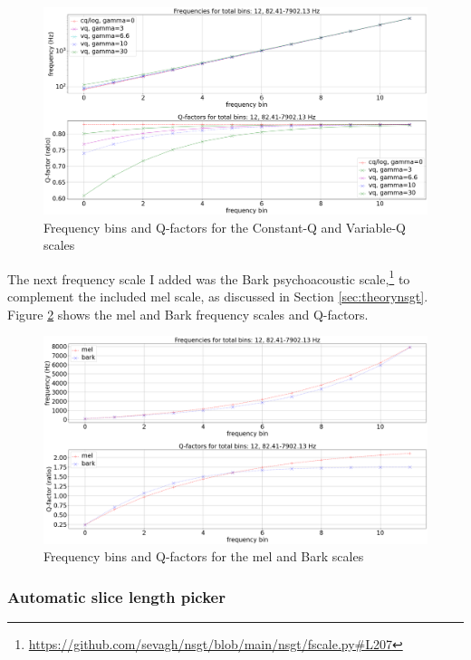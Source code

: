 \documentclass[report.tex]{subfiles}
\begin{document}
\begin{figure}[ht]
	\centering
	\includegraphics[width=\textwidth]{./images-freqscales/vqlog.png}
	\caption{Frequency bins and Q-factors for the Constant-Q and Variable-Q scales}
	\label{fig:vq}
\end{figure}

The next frequency scale I added was the Bark psychoacoustic scale,\footnote{\url{https://github.com/sevagh/nsgt/blob/main/nsgt/fscale.py\#L207}} to complement the included mel scale, as discussed in Section \ref{sec:theorynsgt}. Figure \ref{fig:melbarkfsandqs} shows the mel and Bark frequency scales and Q-factors.

\begin{figure}[ht]
	\centering
	\includegraphics[width=\textwidth]{./images-freqscales/melbarkpitchesqs.png}
	\caption{Frequency bins and Q-factors for the mel and Bark scales}
	\label{fig:melbarkfsandqs}
\end{figure}

\subsubsection{Automatic slice length picker}
\label{sec:sllenpicker}
\end{document}
